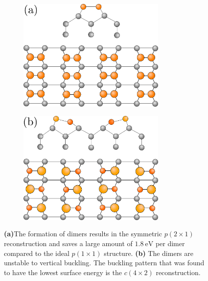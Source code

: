 	\begin{figure}[htb]
		\begin{subfigure}{0.5\textwidth}
			\centering
			\includegraphics[width=0.8\textwidth]{graphics/p(2x1)-sym.png}
			\label{p(2x1)-symmetric}
		\end{subfigure}
		\begin{subfigure}{0.5\textwidth}
			\centering
			\includegraphics[width=0.8\textwidth]{graphics/c(4x2).png}
			\label{c(4x2)}
		\end{subfigure}
		\caption{ \textbf{(a)}The formation of dimers results in the symmetric $p(2\times1)$ reconstruction and saves a large amount of $1.8~\text{eV}$ per dimer compared to the ideal $p(1\times1)$ structure. \textbf{(b)} The dimers are unstable to vertical buckling. The buckling pattern that was found to have the lowest surface energy is the $c(4\times2)$ reconstruction.}
		\label{Fig::dimer-configs}
	\end{figure}
